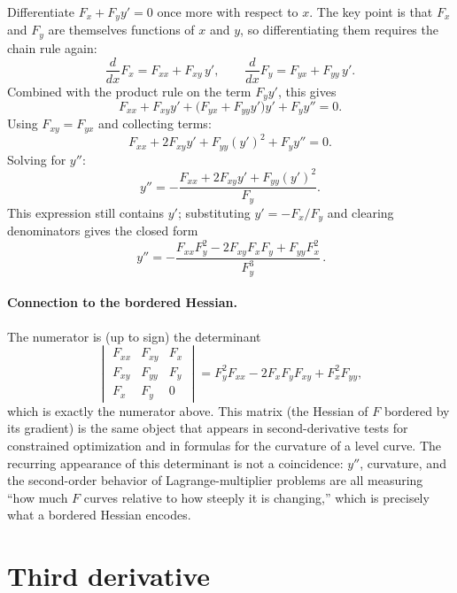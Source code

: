 \documentclass{essay}
\begin{document}
Differentiate \(F_{x} + F_{y} y' = 0\) once more with respect to \(x\). The key point is that \(F_{x}\)
and \(F_{y}\) are themselves functions of \(x\) and \(y\), so differentiating them requires the
chain rule again:
\[ \frac{d}{dx}F_{x} = F_{xx} + F_{xy}\,y', \qquad \frac{d}{dx}F_{y} = F_{yx} + F_{yy}\,y'. \]
Combined with the product rule on the term \(F_{y} y'\), this gives
\[ F_{xx} + F_{xy}y' + \big(F_{yx} + F_{yy}y'\big)y' + F_{y} y'' = 0. \]
Using \(F_{xy} = F_{yx}\) and collecting terms:
\[ F_{xx} + 2F_{xy}y' + F_{yy}(y')^{2} + F_{y} y'' = 0. \]
Solving for \(y''\):
\[ y'' = -\frac{F_{xx} + 2F_{xy}y' + F_{yy}(y')^{2}}{F_{y}}. \]
This expression still contains \(y'\); substituting \(y' = -F_{x}/F_{y}\) and clearing denominators
gives the closed form
\[ \boxed{\,y'' = -\dfrac{F_{xx}F_{y}^{2} - 2F_{xy}F_{x}F_{y} + F_{yy}F_{x}^{2}}{F_{y}^{3}}\,}. \]

\paragraph{Connection to the bordered Hessian.} The numerator is (up to sign) the
determinant
\[
  \begin{vmatrix}
    F_{xx} & F_{xy} & F_{x} \\
    F_{xy} & F_{yy} & F_{y} \\
    F_{x}    & F_{y}    & 0
  \end{vmatrix}
  = F_{y}^{2} F_{xx} - 2F_{x}F_{y}F_{xy} + F_{x}^{2}F_{yy},
\]
which is exactly the numerator above. This matrix (the Hessian of \(F\) bordered by its
gradient) is the same object that appears in second-derivative tests for constrained
optimization and in formulas for the curvature of a level curve. The recurring appearance
of this determinant is not a coincidence: \(y''\), curvature, and the second-order behavior of
Lagrange-multiplier problems are all measuring ``how much \(F\) curves relative to how steeply
it is changing,'' which is precisely what a bordered Hessian encodes.

\section{Third derivative}
\end{document}
